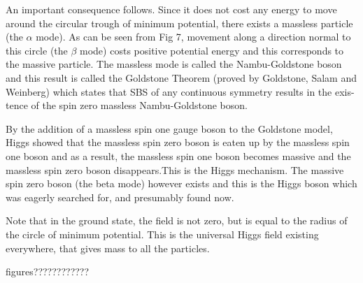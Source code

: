 An important consequence follows. Since it does not cost any energy to move
around the circular trough of minimum potential, there exists a massless particle
(the $\alpha$ mode). As can be seen from Fig 7, movement along a direction normal
to this circle (the $\beta$ mode) costs positive potential energy and this corresponds to
the massive particle. The massless mode is called the Nambu-Goldstone boson
and this result is called the Goldstone Theorem (proved by Goldstone, Salam and
Weinberg) which states that SBS of any continuous symmetry results in the exis-
tence of the spin zero massless Nambu-Goldstone boson.


By the addition of a massless spin one gauge boson to the Goldstone model,
Higgs showed that the massless spin zero boson is eaten up by the massless spin
one boson and as a result, the massless spin one boson becomes massive and the
massless spin zero boson disappears.This is the Higgs mechanism. The massive
spin zero boson (the beta mode) however exists and this is the Higgs boson which
was eagerly searched for, and presumably found now.

Note that in the ground state, the field is not zero, but is equal to the radius of the circle of minimum potential. This is the universal Higgs field existing
everywhere, that gives mass to all the particles.


figures????????????
